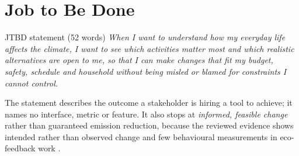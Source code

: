 \documentclass[12pt, a4paper]{article}
\begin{document}
\section{Job to Be Done}
\begin{jtbdbox}{JTBD statement (52 words)}
\textit{When I want to understand how my everyday life affects the climate, I want to see which activities matter most and which realistic alternatives are open to me, so that I can make changes that fit my budget, safety, schedule and household without being misled or blamed for constraints I cannot control.}
\end{jtbdbox}
The statement describes the outcome a stakeholder is hiring a tool to achieve; it names no interface, metric or feature. It also stops at \emph{informed, feasible change} rather than guaranteed emission reduction, because the reviewed evidence shows intended rather than observed change \cite{hoffmann2024} and few behavioural measurements in eco-feedback work \cite{froehlich2010}.
\end{document}
